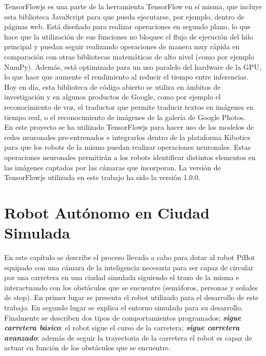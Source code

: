 \documentclass{report}
\begin{document}
TensorFlowjs es una parte de la herramienta TensorFlow en sí misma, que incluye esta biblioteca JavaScript para que pueda ejecutarse, por ejemplo, dentro de páginas web. Está diseñado para realizar operaciones en segundo plano, lo que hace que la utilización de sus funciones no bloquee el flujo de ejecución del hilo principal y puedan seguir realizando operaciones de manera muy rápida en comparación con otras bibliotecas matemáticas de alto nivel (como por ejemplo NumPy). Además, está optimizado para un uso paralelo del hardware de la GPU, lo que hace que aumente el rendimiento al reducir el tiempo entre inferencias. Hoy en día, esta biblioteca de código abierto se utiliza en ámbitos de investigación y en algunos productos de Google, como por ejemplo el reconocimiento de voz, el traductor que permite traducir textos en imágenes en tiempo real, o el reconocimiento de imágenes de la galería de Google Photos.
\\

En este proyecto se ha utilizado TensorFlowjs para hacer uso de los modelos de redes neuronales pre-entrenados e integrarlos dentro de la plataforma Kibotics para que los robots de la misma puedan realizar operaciones neuronales. Estas operaciones neuronales permitirán a los robots identificar distintos elementos en las imágenes captadas por las cámaras que incorporan. La versión de TensorFlowjs utilizada en este trabajo ha sido la versión 1.0.0.

\chapter{Robot Autónomo en Ciudad Simulada}

En este capítulo se describe el proceso llevado a cabo para dotar al robot PiBot equipado con una cámara de la inteligencia necesaria para ser capaz de circular por una carretera en una ciudad simulada siguiendo el trazo de la misma e interactuando con los obstáculos que se encuentre (semáforos, personas y señales de stop). En primer lugar se presenta el robot utilizado para el desarrollo de este trabajo. En segundo lugar se explica el entorno simulado para su desarrollo. Finalmente se describen dos tipos de comportamientos programados; \textit{\textbf{sigue carretera básico}}: el robot sigue el curso de la carretera; \textit{\textbf{sigue carretera avanzado}}: además de seguir la trayectoria de la carretera el robot es capaz de actuar en función de los obstáculos que se encuentre. 
\end{document}
